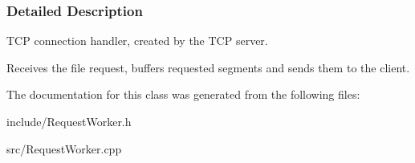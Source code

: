\subsubsection{Detailed Description}
T\+CP connection handler, created by the T\+CP server. 

Receives the file request, buffers requested segments and sends them to the client. 

The documentation for this class was generated from the following files\+:\begin{DoxyCompactItemize}
\item 
include/Request\+Worker.\+h\item 
src/Request\+Worker.\+cpp\end{DoxyCompactItemize}
